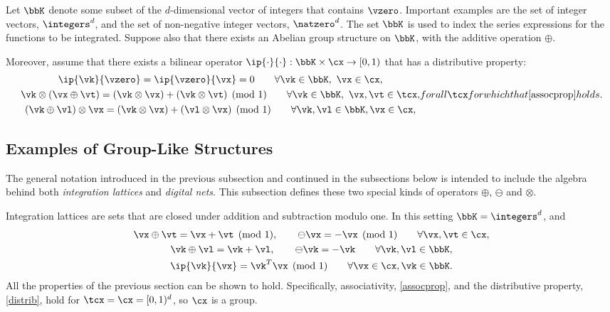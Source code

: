 \documentclass[]{elsarticle}
\theoremstyle{definition}
\begin{document}
Let $\bbK$ denote some subset of the $d$-dimensional vector of integers that contains $\vzero$.  Important examples are the set of integer vectors, $\integers^d$, and the set of non-negative integer vectors, $\natzero^d$.  The set $\bbK$ is used to index the series expressions for the functions to be integrated.  Suppose also that there exists an Abelian group structure on $\bbK$, with the additive operation $\oplus$.  

Moreover, assume that there exists a bilinear operator $\ip{\cdot}{\cdot}: \bbK \times \cx \to [0,1)$ that has a distributive property:
\begin{subequations} \label{distrib}
\begin{gather}
\ip{\vk}{\vzero} = \ip{\vzero}{\vx} = 0 \qquad \forall \vk \in \bbK, \ \vx \in \cx,\\
\vk \otimes (\vx \oplus \vt) = (\vk\otimes\vx) + (\vk\otimes\vt) \pmod 1 \qquad \forall \vk \in \bbK, \ \vx, \vt \in \tcx, \\
(\vk \oplus \vl) \otimes \vx = (\vk\otimes\vx) + (\vl\otimes\vx) \pmod 1 \qquad \forall \vk,\vl \in \bbK, \vx \in \cx,
\end{gather}
for all $\tcx$ for which that \eqref{assocprop} holds.
\end{subequations}

\subsection{Examples of Group-Like Structures}
The general notation introduced in the previous subsection and continued in the subsections below is intended to include the algebra behind both \emph{integration lattices} and \emph{digital nets}.  This subsection defines these two special kinds of operators $\oplus$, $\ominus$ and $\otimes$.

Integration lattices are sets that are closed under addition and subtraction modulo one.  In this setting $\bbK=\integers^d$, and
\begin{gather*}
\vx \oplus \vt = \vx + \vt \pmod 1, \qquad \ominus \vx = -\vx \pmod 1 \qquad \forall \vx, \vt \in \cx, \\
\vk \oplus \vl = \vk + \vl, \qquad \ominus \vk = -\vk \qquad \forall \vk, \vl \in \bbK, \\
\ip{\vk}{\vx} = \vk^T \vx \pmod 1 \qquad \forall \vx \in \cx, \vk \in \bbK.
\end{gather*}
All the properties of the previous section can be shown to hold.  Specifically, associativity, \eqref{assocprop}, and the distributive property, \eqref{distrib}, hold for $\tcx = \cx=[0,1)^d$, so $\cx$ is a group.  
\end{document}
